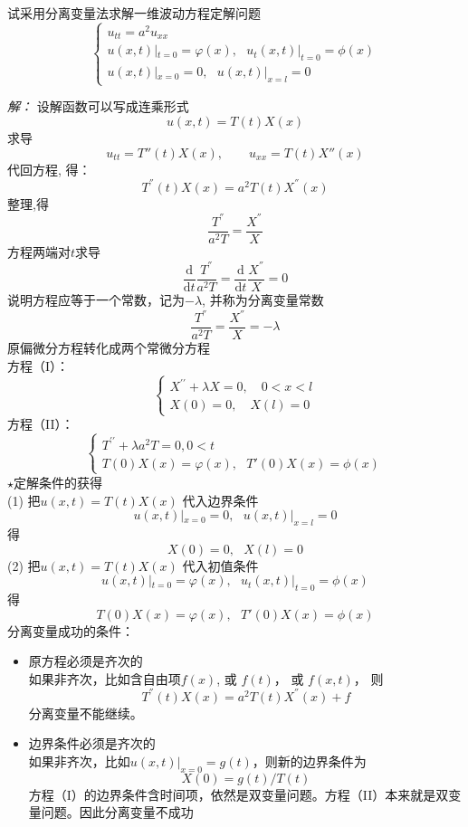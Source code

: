 \begin{example}
	试采用分离变量法求解一维波动方程定解问题
	$$\begin{cases}
		u_{tt}=a^2u_{xx}\\
		u(x,t)|_{t=0}= \varphi (x) ,~~~ u_t(x,t)|_{t=0}= \phi (x) \\
		u(x,t)|_{x=0}= 0, ~~~  u(x,t)|_{x=l}= 0 
	\end{cases}$$ 
\end{example}
\emph{解：}
	设解函数可以写成连乘形式 $$\displaystyle  u(x,t)=T(t)X(x) $$
	求导
	\[ u_{tt} = T''(t)X(x), \qquad  u_{xx} = T(t)X''(x)\]
	代回方程, 得：
	\begin{equation*}
		 T^{''}(t)X(x) =a^2 T(t)X^{''}(x) 
	\end{equation*}
	整理,得
	$$ \dfrac{T^{''}}{a^2 T}=\dfrac{X^{''} }{X} $$
	方程两端对$t$求导
	$$ \frac{\mathrm{d}}{\mathrm{d}t}\dfrac{T^{''}}{a^2 T}=\frac{\mathrm{d}}{\mathrm{d}t}\dfrac{X^{''} }{X} = 0 $$
	说明方程应等于一个常数，记为$-\lambda$, 并称为分离变量常数
	$$ \dfrac{T^{''}}{a^2 T}=\dfrac{X^{''} }{X} =-\lambda $$
	原偏微分方程转化成两个常微分方程\\
方程（I）：
$$ \begin{cases}
	X ^{\prime\prime} +\lambda X=0, \quad 0<x<l \\
	X(0)=0, \quad X(l)=0
	\end{cases}  
$$ 
方程（II）：
$$ \begin{cases}
	T^{\prime\prime} +\lambda a^2 T=0,  0<t \\
	T(0)X(x)= \varphi (x) ,~~~ T'(0)X(x)= \phi (x)
	\end{cases} 
$$ 
$\star $定解条件的获得 \\
(1) 把$\displaystyle  u(x,t)=T(t)X(x) $ 代入边界条件
$$u(x,t)|_{x=0}= 0, ~~~  u(x,t)|_{x=l}= 0 $$
得 $$X(0)= 0, ~~~  X(l)= 0 $$
(2) 把$\displaystyle  u(x,t)=T(t)X(x) $ 代入初值条件
$$
u(x,t)|_{t=0}= \varphi (x) ,~~~ u_t(x,t)|_{t=0}= \phi (x)   
$$ 
得
$$
T(0)X(x)= \varphi (x) ,~~~ T'(0)X(x) = \phi (x) 
$$ 
分离变量成功的条件：
\begin{itemize}
	\item 原方程必须是齐次的 \\
	如果非齐次，比如含自由项$f(x)$, 或 $f(t)$， 或 $f(x,t)$， 则
	$$T^{''}(t)X(x) =a^2 T(t)X^{''}(x) + f $$分离变量不能继续。 
	\item 边界条件必须是齐次的 \\
	如果非齐次，比如$u(x,t)|_{x=0}= g(t)$，则新的边界条件为 
	$$X(0)= g(t)/T(t)$$方程（I）的边界条件含时间项，依然是双变量问题。方程（II）本来就是双变量问题。因此分离变量不成功
\end{itemize}

